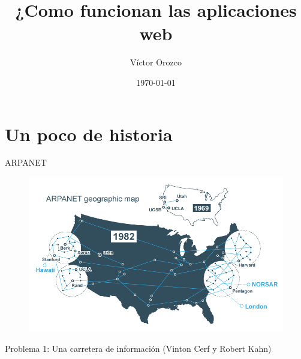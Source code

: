 \documentclass[aspectratio=169]{beamer}
\title{¿Como funcionan las aplicaciones web}
\author{Víctor Orozco}
\institute{Academik}
\date{\today}
\begin{document}
{
    \frame{\titlepage}
}


{
	\section{Un poco de historia}
}


\begin{frame}{ARPANET}
	\begin{figure}
		\centering
		\includegraphics[width=0.7\linewidth]{Images/darpa.png}
	\end{figure}
	
	Problema 1: Una carretera de información (Vinton Cerf y Robert Kahn)
\end{frame}
\end{document}
